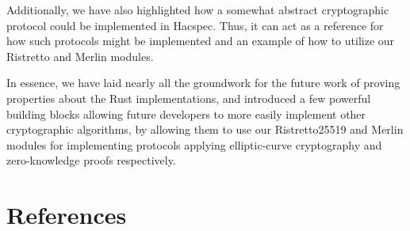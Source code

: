 \documentclass{article}
\begin{document}
Additionally, we have also highlighted how a somewhat abstract
cryptographic protocol could be implemented in Hacspec. Thus, it can
act as a reference for how such protocols might be implemented and
an example of how to utilize our Ristretto and Merlin modules.

In essence, we have laid nearly all the groundwork for the future work
of proving properties about the Rust implementations, and introduced a
few powerful building blocks allowing future developers to more easily
implement other cryptographic algorithms, by allowing them to use our
Ristretto25519 and Merlin modules for implementing protocols applying
elliptic-curve cryptography and zero-knowledge proofs respectively.

\section{References} \label{references}
\printbibliography
\end{document}
